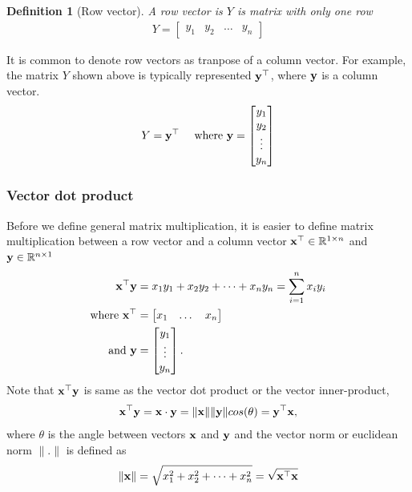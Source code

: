 \documentclass[twocolumn]{article}
\newtheorem{defn}{Definition}
\begin{document}
\begin{defn}[Row vector]
  A row vector is $Y$ is matrix  with only one row
  \begin{align}
    Y  =  \begin{bmatrix}
      y_{1} &
      y_{2} &
      \dots  &
      y_{n}
    \end{bmatrix}
  \end{align}
\end{defn}
It is common  to denote row vectors as tranpose  of  a  column vector. For
example, the  matrix  $Y$ shown above is typically represented  $\mathbf{y}^\top$, where
$\mathbf{y}$  is a column vector.
%
  \begin{align}
    Y  &=  \mathbf{y}^\top & \text{ where } \mathbf{y} = \begin{bmatrix}
      y_{1} \\
      y_{2} \\
      \vdots  \\
      y_{n}
    \end{bmatrix}
  \end{align}

\subsubsection{Vector dot product}
Before we define  general matrix multiplication, it  is easier to define matrix
multiplication   between a row vector and a column vector $\mathbf{x}^\top  \in
\mathbb{R}^{1 \times  n}$ and $\mathbf{y}\in\mathbb{R}^{n \times 1}$
%
\begin{align}
  \mathbf{x}^\top \mathbf{y}  &= x_1y_1 + x_2 y_2 + \dots  + x_n y_n = \sum_{i=1}^n  x_iy_i
\\
\text{where }  \mathbf{x}^\top &=  \begin{bmatrix} x_1 &  \dots  &  x_n \end{bmatrix}
\notag \\
  \text{  and  }\mathbf{y} &=  \begin{bmatrix} y_1 \\  \vdots  \\  y_n \end{bmatrix}.
  \notag
\end{align}
%
Note that $\mathbf{x}^\top \mathbf{y}$   is same as the vector  dot product  or the vector
inner-product,
%
\begin{align}
  \mathbf{x}^\top \mathbf{y} = \mathbf{x} \cdot \mathbf{y}  =  \|\mathbf{x}\|\|\mathbf{y}\|cos(\theta) = \mathbf{y}^\top \mathbf{x},
\end{align}
where  $\theta$  is the angle between   vectors $\mathbf{x}$ and $\mathbf{y}$ and  the
vector norm  or euclidean norm $\|.\|$ is defined as
%
\begin{align}
  \|\mathbf{x}\| =  \sqrt{x_1^2 + x_2^2  +   \dots +  x_n^2} = \sqrt{\mathbf{x}^\top\mathbf{x}}
\end{align}
%
\end{document}
